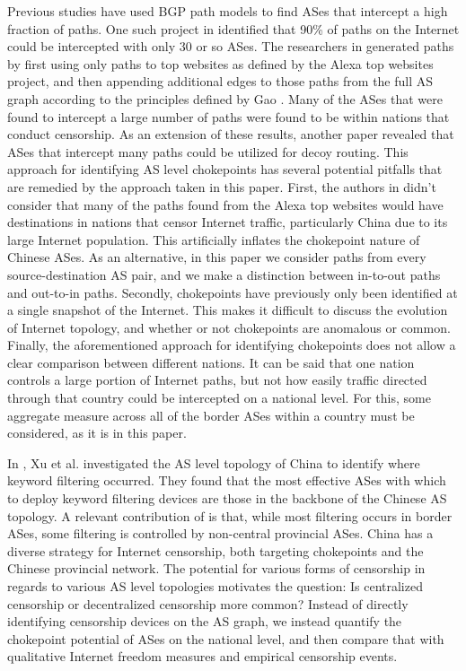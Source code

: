 \documentclass{article}
\begin{document}
\begin{multicols}{2}
Previous studies have used BGP path models to find ASes that
intercept a high fraction of paths. One such project in \cite{throats}
identified that 90\% of paths on the Internet could be intercepted with only 30
or so ASes. The researchers in \cite{throats} generated paths by first using
only paths to top websites as defined by the Alexa top websites project,
and then appending additional edges to those paths from the full
AS graph according to the principles defined by Gao \cite{gao}. Many of the
ASes that were found to intercept a large number of paths were found to be
within nations that conduct censorship. As an extension of these results,
another paper \cite{decoy} revealed that ASes that intercept many paths could
be utilized for decoy routing. This approach for identifying AS level
chokepoints has several potential pitfalls that are remedied by the approach
taken in this paper. First, the authors in \cite{throats} didn't consider that
many of the paths found from the Alexa top websites would have destinations in
nations that censor Internet traffic, particularly China due to its large
Internet population. This artificially inflates the chokepoint nature of
Chinese ASes. As an alternative, in this paper we consider paths from every
source-destination AS pair, and we make a distinction between in-to-out paths
and out-to-in paths. Secondly, chokepoints have previously only been
identified at a single snapshot of the Internet. This makes it difficult to
discuss the evolution of Internet topology, and whether or not chokepoints are
anomalous or common. Finally, the aforementioned approach for identifying
chokepoints does not allow a clear comparison between different nations. It
can be said that one nation controls a large portion of Internet paths, but
not how easily traffic directed through that country could be intercepted on a
national level. For this, some aggregate measure across all of the border ASes
within a country must be considered, as it is in this paper.     
\par
In \cite{chinafiltering}, Xu et al. investigated the AS level topology of China
to identify where keyword filtering occurred. They found that the most
effective ASes with which to deploy keyword filtering devices are those in the
backbone of the Chinese AS topology. A relevant contribution of
\cite{chinafiltering} is that, while most filtering occurs in border ASes,
some filtering is controlled by non-central provincial ASes. China has a
diverse strategy for Internet censorship, both targeting chokepoints and the
Chinese provincial network. The potential for various forms of censorship in
regards to various AS level topologies motivates the question: Is centralized
censorship or decentralized censorship more common? Instead of directly
identifying censorship devices on the AS graph, we instead quantify the
chokepoint potential of ASes on the national level, and then compare that with
qualitative Internet freedom measures and empirical censorship events.


\end{multicols}
\end{document}
